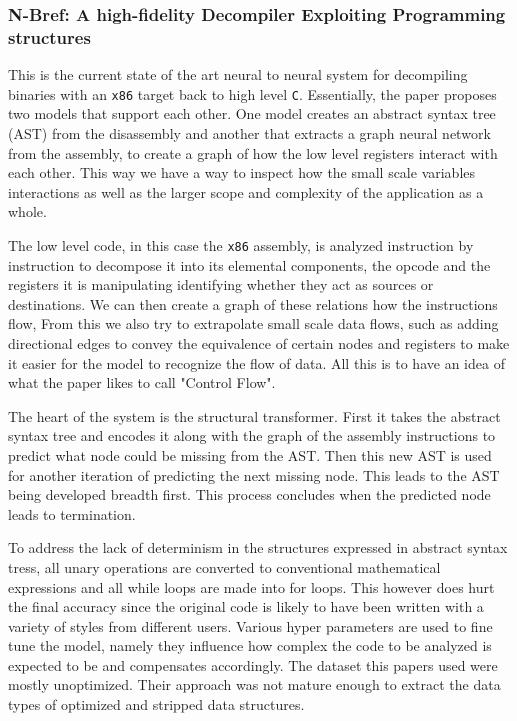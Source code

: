 \documentclass[conference,a4paper]{IEEEtran}
\begin{document}
\subsubsection{N-Bref: A high-fidelity Decompiler Exploiting Programming structures}

This is the current state of the art neural to neural system for decompiling binaries with an \verb|x86| target back to high level \verb|C|\cite{fu_n-bref_2020}.
Essentially, the paper proposes two models that support each other.
One model creates an abstract syntax tree (AST) from the disassembly and another that extracts a graph neural network from the assembly, to create a graph of how the low level registers interact with each other.
This way we have a way to inspect how the small scale variables interactions as well as the larger scope and complexity of the application as a whole.

The low level code, in this case the \verb|x86| assembly, is analyzed instruction by instruction to decompose it into its elemental components, the opcode and the registers it is manipulating identifying whether they act as sources or destinations.
We can then create a graph of these relations how the instructions flow,
From this we also try to extrapolate small scale data flows, such as adding directional edges to convey the equivalence of certain nodes and registers to make it easier for the model to recognize the flow of data.
All this is to have an idea of what the paper likes to call "Control Flow".

The heart of the system is the structural transformer.
First it takes the abstract syntax tree and encodes it along with the graph of the assembly instructions to predict what node could be missing from the AST.
Then this new AST is used for another iteration of predicting the next missing node.
This leads to the AST being developed breadth first.
This process concludes when the predicted node leads to termination.

To address the lack of determinism in the structures expressed in abstract syntax tress, all unary operations are converted to conventional mathematical expressions and all while loops are made into for loops.
This however does hurt the final accuracy since the original code is likely to have been written with a variety of styles from different users.
Various hyper parameters are used to fine tune the model, namely they influence how complex the code to be analyzed is expected to be and compensates accordingly.
The dataset this papers used were mostly unoptimized. Their approach was not mature enough to extract the data types of optimized and stripped data structures.
\end{document}
